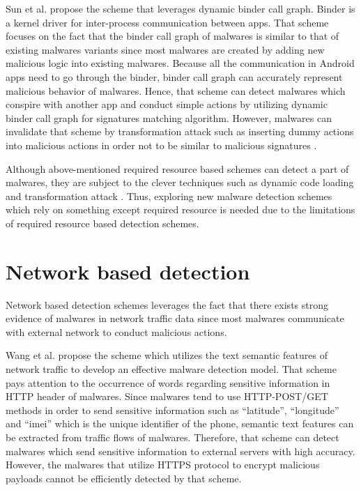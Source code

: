 Sun et al. \cite{sun2017monet} propose the scheme that leverages dynamic binder call graph.
Binder is a kernel driver for inter-process communication between apps.
That scheme focuses on the fact that the binder call graph of malwares is similar to that of existing malwares variants since most malwares are created by adding new malicious logic into existing malwares.
Because all the communication in Android apps need to go through the binder, binder call graph can accurately represent malicious behavior of malwares.
Hence, that scheme can detect malwares which conspire with another app and conduct simple actions by utilizing dynamic binder call graph for signatures matching algorithm.  
However, malwares can invalidate that scheme by transformation attack such as inserting dummy actions into malicious actions in order not to be similar to malicious signatures \cite{faruki2015android}.

Although above-mentioned required resource based schemes can detect a part of malwares, they are subject to the clever techniques such as dynamic code loading \cite{arora2018ntpdroid} and transformation attack \cite{zheng2012adam} \cite{rastogi2013droidchameleon}.
Thus, exploring new malware detection schemes which rely on something except required resource is needed due to the limitations of required resource based detection schemes.

\section{Network based detection} 
Network based detection schemes leverages the fact that there exists strong evidence of malwares in network traffic data since most malwares communicate with external network to conduct malicious actions.

Wang et al. \cite{wang2018detecting} propose the scheme which utilizes the text semantic features of network traffic to develop an effective malware detection model.
That scheme pays attention to the occurrence of words regarding sensitive information in HTTP header of malwares.
Since malwares tend to use HTTP-POST/GET methods in order to send sensitive information such as ``latitude'', ``longitude'' and ``imei'' which is the unique identifier of the phone, semantic text features can be extracted from traffic flows of malwares. 
Therefore, that scheme can detect malwares which send sensitive information to external servers with high accuracy.
However, the malwares that utilize HTTPS protocol to encrypt malicious payloads cannot be efficiently detected by that scheme.

